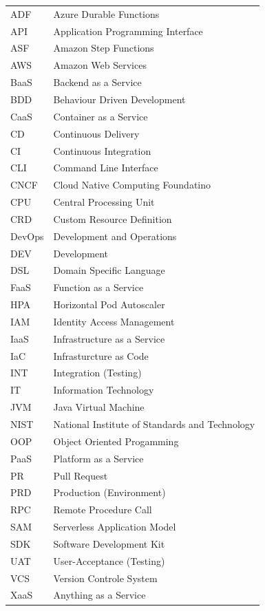 \documentclass[11pt]{article}
\begin{document}
\begin{tabular}{ p{2cm} p{10cm}} 
ADF & Azure Durable Functions \\
API & Application Programming Interface \\
ASF & Amazon Step Functions \\
AWS & Amazon Web Services \\
BaaS & Backend as a Service \\
BDD & Behaviour Driven Development \\
CaaS & Container as a Service \\  
CD & Continuous Delivery \\  
CI & Continuous Integration \\
CLI & Command Line Interface \\
CNCF & Cloud Native Computing Foundatino \\
CPU & Central Processing Unit \\
CRD & Custom Resource Definition \\
DevOps & Development and Operations \\  
DEV & Development \\
DSL & Domain Specific Language \\
FaaS & Function as a Service \\ 
HPA & Horizontal Pod Autoscaler \\
IAM & Identity Access Management \\
IaaS & Infrastructure as a Service \\
IaC & Infrasturcture as Code \\
INT & Integration (Testing) \\
IT & Information Technology \\
JVM & Java Virtual Machine \\
NIST & National Institute of Standards and Technology \\
OOP & Object Oriented Progamming \\
PaaS & Platform as a Service \\
PR & Pull Request \\
PRD & Production (Environment) \\
RPC & Remote Procedure Call \\
SAM & Serverless Application Model \\
SDK & Software Development Kit \\
UAT & User-Acceptance (Testing) \\
VCS & Version Controle System \\
XaaS & Anything as a Service \\
\end{tabular}
\newpage
\tableofcontents
\newpage
\end{document}
